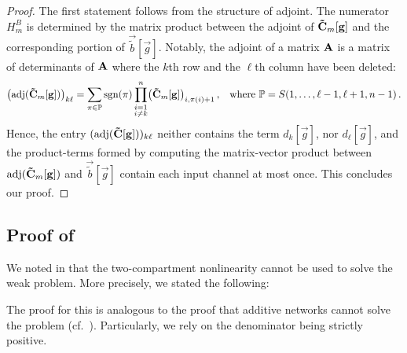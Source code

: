 \begin{proof}
The first statement follows from the structure of adjoint.
The numerator $H_m^B$ is determined by the matrix product between the adjoint of $\mathbf{\tilde C}_m[\mathbf{g}]$ and the corresponding portion of $\vec{\tilde b}[\vec g]$.
Notably, the adjoint of a matrix $\mathbf{A}$ is a matrix of determinants of $\mathbf{A}$ where the $k$th row and the $\ell$th column have been deleted:
\begin{align*}
	\bigl(\operatorname{\mathrm{adj}}(\mathbf{\tilde C}_m[\mathbf{g}])\bigr)_{k\ell}
		&= \sum_{\pi \in \mathbb{P}} \operatorname{\mathrm{sgn}}(\pi) \prod_{\substack{i=1\\i \neq k}}^n \bigl( \mathbf{\tilde C}_m[\mathbf{g}] \bigr)_{i, \pi(i) + 1} \,,
	& \text{where } \mathbb{P} = S({1, \ldots, \ell - 1, \ell + 1, n - 1}) \,.
\end{align*}
Hence, the entry $(\operatorname{\mathrm{adj}}(\mathbf{\tilde C}[\mathbf{g}]))_{k\ell}$ neither contains the term $d_{k}[\vec g]$, nor $d_{\ell}[\vec g]$, and the product-terms formed by computing the matrix-vector product between $\operatorname{\mathrm{adj}}(\mathbf{\tilde C}_m[\mathbf{g}])$ and $\vec{\tilde b}[\vec g]$ contain each input channel at most once.
This concludes our proof.
\end{proof}

\subsection{Proof of }
\label{app:thm_two_comp_xor}

We noted in  that the two-compartment \LIF nonlinearity cannot be used to solve the weak \XOR problem.
More precisely, we stated the following:

\ThmTwoCompXor*

The proof for this is analogous to the proof that additive networks cannot solve the \XOR problem (cf.~).
Particularly, we rely on the denominator being strictly positive.

